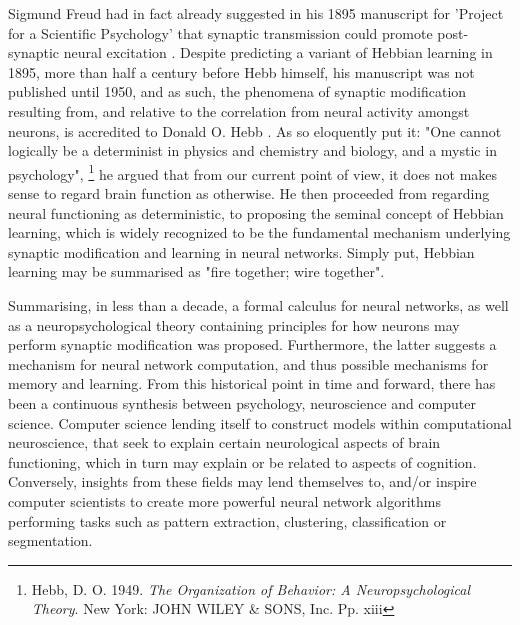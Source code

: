 Sigmund Freud had in fact already suggested in his 1895 manuscript for 'Project for a Scientific Psychology' that synaptic transmission could promote post-synaptic neural excitation \citep{Kiernan2011}. Despite predicting a variant of Hebbian learning in 1895, more than half a century before Hebb himself, his manuscript was not published until 1950, and as such, the phenomena of synaptic modification resulting from, and relative to the correlation from neural activity amongst neurons, is accredited to Donald O. Hebb \citep{Kiernan2011}.
As \cite{Hebb1949} so eloquently put it: "One cannot logically be a determinist in physics and chemistry and biology, and a mystic in psychology",
\footnote{Hebb, D. O. 1949. \textit{The Organization of Behavior: A Neuropsychological Theory}. New York: JOHN WILEY \& SONS, Inc. Pp. xiii}
he argued that from our current point of view, it does not makes sense to regard brain function as otherwise. He then proceeded from regarding neural functioning as deterministic, to proposing the seminal concept of Hebbian learning, which is widely recognized to be the fundamental mechanism underlying synaptic modification and learning in neural networks. Simply put, Hebbian learning may be summarised as "fire together; wire together".

Summarising, in less than a decade, a formal calculus for neural networks, as well as a neuropsychological theory containing principles for how neurons may perform synaptic modification was proposed. Furthermore, the latter suggests a mechanism for neural network computation, and thus possible mechanisms for memory and learning. From this historical point in time and forward, there has been a continuous synthesis between psychology, neuroscience and computer science. Computer science lending itself to construct models within computational neuroscience, that seek to explain certain neurological aspects of brain functioning, which in turn may explain or be related to aspects of cognition. Conversely, insights from these fields may lend themselves to, and/or inspire computer scientists to create more powerful neural network algorithms performing tasks such as pattern extraction, clustering, classification or segmentation. 

